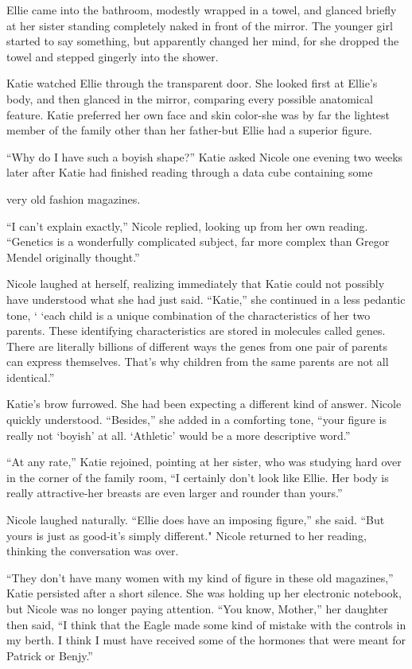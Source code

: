 \documentclass[]{article}
\begin{document}
{Ellie came into the bathroom, modestly wrapped in a towel, and glanced briefly at her sister standing completely naked in front of the mirror.  The younger girl started to say something, but apparently changed her mind, for she dropped the towel and stepped gingerly into the shower.

Katie watched Ellie through the transparent door.  She looked first at Ellie’s body, and then glanced in the mirror, comparing every possible anatomical feature.  Katie preferred her own face and skin color-she was by far the lightest member of the family other than her father-but Ellie had a superior figure.

“Why do I have such a boyish shape?” Katie asked Nicole one evening two weeks later after Katie had finished reading through a data cube containing some

very old fashion magazines.

“I can’t explain exactly,” Nicole replied, looking up from her own reading.  “Genetics is a wonderfully complicated subject, far more complex than Gregor Mendel originally thought.”

Nicole laughed at herself, realizing immediately that Katie could not possibly have understood what she had just said.  “Katie,” she continued in a less pedantic tone, ‘ ‘each child is a unique combination of the characteristics of her two parents.  These identifying characteristics are stored in molecules called genes.  There are literally billions of different ways the genes from one pair of parents can express themselves.  That’s why children from the same parents are not all identical.”

Katie’s brow furrowed.  She had been expecting a different kind of answer.  Nicole quickly understood.  “Besides,” she added in a comforting tone, “your figure is really not ‘boyish’ at all.  ‘Athletic’ would be a more descriptive word.”

“At any rate,” Katie rejoined, pointing at her sister, who was studying hard over in the corner of the family room, “I certainly don’t look like Ellie.  Her body is really attractive-her breasts are even larger and rounder than yours.”

Nicole laughed naturally.  “Ellie does have an imposing figure,” she said.  “But yours is just as good-it’s simply different."  Nicole returned to her reading, thinking the conversation was over.

“They don’t have many women with my kind of figure in these old magazines,” Katie persisted after a short silence.  She was holding up her electronic notebook, but Nicole was no longer paying attention.  “You know, Mother,” her daughter then said, “I think that the Eagle made some kind of mistake with the controls in my berth.  I think I must have received some of the hormones that were meant for Patrick or Benjy.”

}
\end{document}
